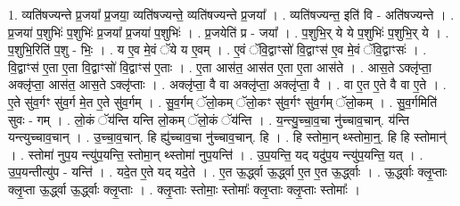 \documentclass[17pt]{extarticle}
\begin{document}
1. व्यति॑षज्यन्ते प्र॒जया᳚ प्र॒जया॒ व्यति॑षज्यन्ते॒ व्यति॑षज्यन्ते प्र॒जया᳚ । . व्यति॑षज्यन्त॒ इति॑ वि - अति॑षज्यन्ते । . प्र॒जया॑ प॒शुभिः॑ प॒शुभिः॑ प्र॒जया᳚ प्र॒जया॑ प॒शुभिः॑ । . प्र॒जयेति॑ प्र - जया᳚ । . प॒शुभि॒र् ये ये प॒शुभिः॑ प॒शुभि॒र् ये । . प॒शुभि॒रिति॑ प॒शु - भिः॒ । . य ए॒व मे॒वं ॅये य ए॒वम् । . ए॒वं ॅवि॒द्वाꣳसो॑ वि॒द्वाꣳस॑ ए॒व मे॒वं ॅवि॒द्वाꣳसः॑ । . वि॒द्वाꣳस॑ ए॒ता ए॒ता वि॒द्वाꣳसो॑ वि॒द्वाꣳस॑ ए॒ताः । . ए॒ता आस॑त॒ आस॑त ए॒ता ए॒ता आस॑ते । . आस॒ते ऽक्लृ॑प्ता॒ अक्लृ॑प्ता॒ आस॑त॒ आस॒ते ऽक्लृ॑प्ताः । . अक्लृ॑प्ता॒ वै वा अक्लृ॑प्ता॒ अक्लृ॑प्ता॒ वै । . वा ए॒त ए॒ते वै वा ए॒ते । . ए॒ते सु॑व॒र्गꣳ सु॑व॒र्ग मे॒त ए॒ते सु॑व॒र्गम् । . सु॒व॒र्गम् ॅलो॒कम् ॅलो॒कꣳ सु॑व॒र्गꣳ सु॑व॒र्गम् ॅलो॒कम् । . सु॒व॒र्गमिति॑ सुवः - गम् । . लो॒कं ॅय॑न्ति यन्ति लो॒कम् ॅलो॒कं ॅय॑न्ति । . य॒न्त्यु॒च्चा॒व॒चा नु॑च्चाव॒चान्. य॑न्ति यन्त्युच्चाव॒चान् । . उ॒च्चा॒व॒चान्. हि ह्यु॑च्चाव॒चा नु॑च्चाव॒चान्. हि । . हि स्तोमा॒न् थ्स्तोमा॒न्॒. हि हि स्तोमान्॑ । . स्तोमा॑ नुप॒य न्त्यु॑प॒यन्ति॒ स्तोमा॒न् थ्स्तोमा॑ नुप॒यन्ति॑ । . उ॒प॒यन्ति॒ यद् यदु॑प॒य न्त्यु॑प॒यन्ति॒ यत् । . उ॒प॒यन्तीत्यु॑प - यन्ति॑ । . यदे॒त ए॒ते यद् यदे॒ते । . ए॒त ऊ॒र्द्ध्वा ऊ॒र्द्ध्वा ए॒त ए॒त ऊ॒र्द्ध्वाः । . ऊ॒र्द्ध्वाः क्लृ॒प्ताः क्लृ॒प्ता ऊ॒र्द्ध्वा ऊ॒र्द्ध्वाः क्लृ॒प्ताः । . क्लृ॒प्ताः स्तोमाः॒ स्तोमाः᳚ क्लृ॒प्ताः क्लृ॒प्ताः स्तोमाः᳚ । \newline
\end{document}
